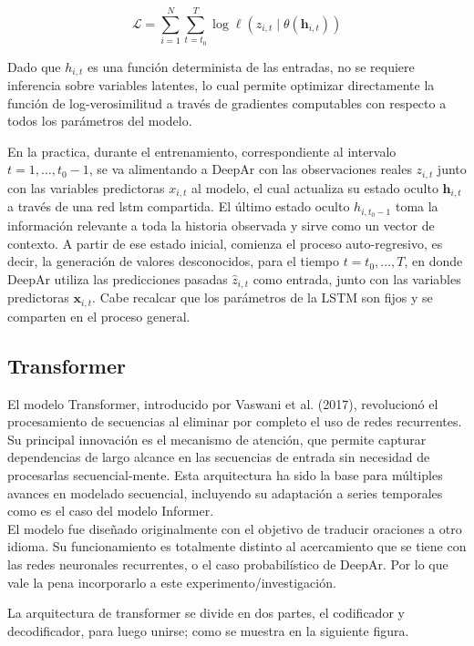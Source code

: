 \documentclass[12pt,letterpaper]{article}
\begin{document}
\begin{equation}
    \mathcal{L} = \sum_{i=1}^N \sum_{t=t_0}^T \log \ell(z_{i,t} \mid \theta(\textbf{h}_{i,t}))
\end{equation}

Dado que $h_{i,t}$ es una función determinista de las entradas, no se requiere inferencia sobre variables latentes, lo cual permite optimizar directamente la función de log-verosimilitud a través de gradientes computables con respecto a todos los parámetros del modelo.

En la practica, durante el entrenamiento, correspondiente al intervalo $t=1, \dots, t_0-1$, se va alimentando a DeepAr con las observaciones reales $z_{i,t}$ junto con las variables predictoras $x_{i,t}$ al modelo, el cual actualiza su estado oculto $\textbf{h}_{i,t}$ a través de una red lstm compartida. El último estado oculto $h_{i,t_0-1}$ toma la información relevante a toda la historia observada y sirve como un vector de contexto. A partir de ese estado inicial, comienza el proceso auto-regresivo, es decir, la generación de valores desconocidos, para el tiempo $t=t_0, \dots, T$, en donde DeepAr utiliza las predicciones pasadas $\hat{z}_{i,t}$ como entrada, junto con las variables predictoras $\textbf{x}_{i,t}$. Cabe recalcar que los parámetros de la LSTM son fijos y se comparten en el proceso general. 

\subsection{Transformer}

El modelo Transformer, introducido por Vaswani et al. (2017), revolucionó el procesamiento de secuencias al eliminar por completo el uso de redes recurrentes. Su principal innovación es el mecanismo de atención, que permite capturar dependencias de largo alcance en las secuencias de entrada sin necesidad de procesarlas secuencial-mente. Esta arquitectura ha sido la base para múltiples avances en modelado secuencial, incluyendo su adaptación a series temporales como es el caso del modelo Informer.\\

El modelo fue diseñado originalmente con el objetivo de traducir oraciones a otro idioma. Su funcionamiento es totalmente distinto al acercamiento que se tiene con las redes neuronales recurrentes, o el caso probabilístico de DeepAr. Por lo que vale la pena incorporarlo a este experimento/investigación.

La arquitectura de transformer se divide en dos partes, el codificador y decodificador, para luego unirse; como se muestra en la siguiente figura.
\end{document}

